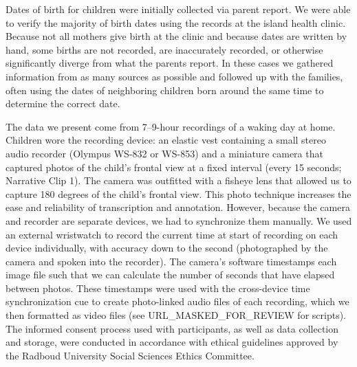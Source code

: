 \documentclass[,man,floatsintext]{apa6}
\begin{document}
Dates of birth for children were initially collected via parent report.
We were able to verify the majority of birth dates using the records at
the island health clinic. Because not all mothers give birth at the
clinic and because dates are written by hand, some births are not
recorded, are inaccurately recorded, or otherwise significantly diverge
from what the parents report. In these cases we gathered information
from as many sources as possible and followed up with the families,
often using the dates of neighboring children born around the same time
to determine the correct date.

The data we present come from 7--9-hour recordings of a waking day at
home. Children wore the recording device: an elastic vest containing a
small stereo audio recorder (Olympus WS-832 or WS-853) and a miniature
camera that captured photos of the child's frontal view at a fixed
interval (every 15 seconds; Narrative Clip 1). The camera was outfitted
with a fisheye lens that allowed us to capture 180 degrees of the
child's frontal view. This photo technique increases the ease and
reliability of transcription and annotation. However, because the camera
and recorder are separate devices, we had to synchronize them manually.
We used an external wristwatch to record the current time at start of
recording on each device individually, with accuracy down to the second
(photographed by the camera and spoken into the recorder). The camera's
software timestamps each image file such that we can calculate the
number of seconds that have elapsed between photos. These timestamps
were used with the cross-device time synchronization cue to create
photo-linked audio files of each recording, which we then formatted as
video files (see URL\_MASKED\_FOR\_REVIEW for scripts). The informed
consent process used with participants, as well as data collection and
storage, were conducted in accordance with ethical guidelines approved
by the Radboud University Social Sciences Ethics Committee.
\end{document}
